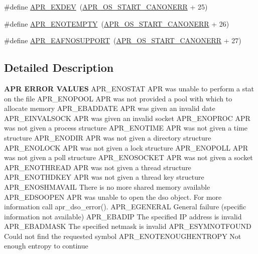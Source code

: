 \begin{DoxyCompactItemize}
\#define \mbox{\hyperlink{group___a_p_r___error_ga0562023bd8ebe580b9bbb9f7b04d3f5d}{A\+P\+R\+\_\+\+E\+X\+D\+EV}}~(\mbox{\hyperlink{group__apr__errno_ga7bca957c11b80b31cb54b0d2cbe9e025}{A\+P\+R\+\_\+\+O\+S\+\_\+\+S\+T\+A\+R\+T\+\_\+\+C\+A\+N\+O\+N\+E\+RR}} + 25)
\item 
\#define \mbox{\hyperlink{group___a_p_r___error_ga01d9259eccdf0576f58b89c4ad8ca4eb}{A\+P\+R\+\_\+\+E\+N\+O\+T\+E\+M\+P\+TY}}~(\mbox{\hyperlink{group__apr__errno_ga7bca957c11b80b31cb54b0d2cbe9e025}{A\+P\+R\+\_\+\+O\+S\+\_\+\+S\+T\+A\+R\+T\+\_\+\+C\+A\+N\+O\+N\+E\+RR}} + 26)
\item 
\#define \mbox{\hyperlink{group___a_p_r___error_ga76b558840838bcb94a4811a8e52df7a6}{A\+P\+R\+\_\+\+E\+A\+F\+N\+O\+S\+U\+P\+P\+O\+RT}}~(\mbox{\hyperlink{group__apr__errno_ga7bca957c11b80b31cb54b0d2cbe9e025}{A\+P\+R\+\_\+\+O\+S\+\_\+\+S\+T\+A\+R\+T\+\_\+\+C\+A\+N\+O\+N\+E\+RR}} + 27)
\end{DoxyCompactItemize}


\subsection{Detailed Description}

\begin{DoxyPre}
{\bfseries APR ERROR VALUES}
APR\_ENOSTAT      APR was unable to perform a stat on the file
APR\_ENOPOOL      APR was not provided a pool with which to allocate memory
APR\_EBADDATE     APR was given an invalid date
APR\_EINVALSOCK   APR was given an invalid socket
APR\_ENOPROC      APR was not given a process structure
APR\_ENOTIME      APR was not given a time structure
APR\_ENODIR       APR was not given a directory structure
APR\_ENOLOCK      APR was not given a lock structure
APR\_ENOPOLL      APR was not given a poll structure
APR\_ENOSOCKET    APR was not given a socket
APR\_ENOTHREAD    APR was not given a thread structure
APR\_ENOTHDKEY    APR was not given a thread key structure
APR\_ENOSHMAVAIL  There is no more shared memory available
APR\_EDSOOPEN     APR was unable to open the dso object.  For more
                 information call apr\_dso\_error().
APR\_EGENERAL     General failure (specific information not available)
APR\_EBADIP       The specified IP address is invalid
APR\_EBADMASK     The specified netmask is invalid
APR\_ESYMNOTFOUND Could not find the requested symbol
APR\_ENOTENOUGHENTROPY Not enough entropy to continue
\end{DoxyPre}




